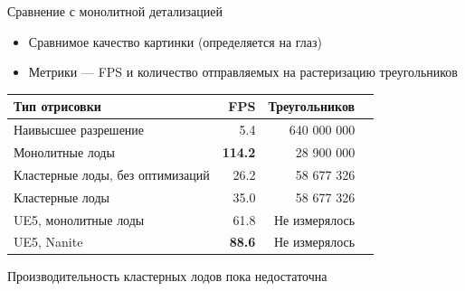 \begin{frame}{Сравнение с монолитной детализацией}
    \begin{itemize}
        \item Сравнимое качество картинки (определяется на глаз)
        \item Метрики --- FPS и количество отправляемых на растеризацию треугольников
    \end{itemize}

    \begin{center}
        \begin{tabular}{lrrr}
            \hline \hline
            Тип отрисовки & FPS & Треугольников \\ \hline
            Наивысшее разрешение & 5.4 & 640 000 000 \\
            Монолитные лоды & \textbf{114.2} & 28 900 000 \\
            Кластерные лоды, без оптимизаций & 26.2 & 58 677 326 \\
            Кластерные лоды & 35.0 & 58 677 326 \\
            \hline
            UE5, монолитные лоды & 61.8 & Не измерялось \\
            UE5, Nanite & \textbf{88.6} & Не измерялось \\
            \hline \hline
        \end{tabular}
    \end{center}

    \alert{Производительность кластерных лодов пока недостаточна}
\end{frame}

